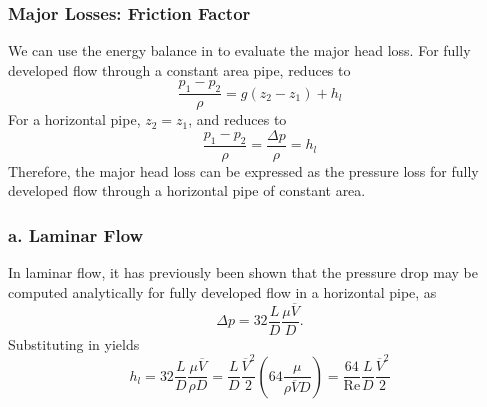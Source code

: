 \subsubsection{Major Losses: Friction Factor}
We can use the energy balance in  to evaluate the major head loss.
For fully developed flow through a constant area pipe,  reduces to
\begin{equation}\label{eq:headlosssimple}
  \frac{p_1 - p_2}{\rho} = g \left( z_2 - z_1 \right) + h_l
\end{equation}
For a horizontal pipe, $z_2 = z_1$, and  reduces to
\begin{equation}\label{eq:headlossflat}
  \frac{p_1 - p_2}{\rho} = \frac{\Delta p}{\rho} = h_l
\end{equation}
Therefore, the major head loss can be expressed as the pressure loss for fully developed flow through a horizontal pipe of constant area.


\subsubsection{a. Laminar Flow}
In laminar flow, it has previously been shown that the pressure drop may be computed analytically for fully developed flow in a horizontal pipe, as
\[ 
\Delta p = 32 \frac{L}{D} \frac{\mu \overline{V}}{D}
.\]
Substituting in  yields
\begin{equation}\label{eq:lamflowheadloss}
  h_l = 32 \frac{L}{D} \frac{\mu \overline{V}}{\rho D} = \frac{L}{D} \frac{\overline{V}^2}{2} \left( 64 \frac{\mu}{\rho \overline{V} D} \right) = \frac{64}{\mathrm{Re}} \frac{L}{D} \frac{\overline{V}^2}{2}
\end{equation}

